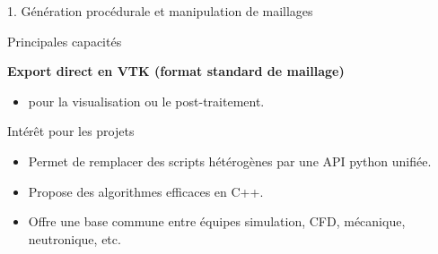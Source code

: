 \begin{frame}{1. Génération procédurale et manipulation de maillages}
\begin{block}{Principales capacités}
\begin{block}{\textbf{Export direct en VTK (format standard de
maillage)}}
\protect\hypertarget{export-direct-en-vtk-format-standard-de-maillage}{}
\begin{itemize}
\tightlist
\item
  pour la visualisation ou le post-traitement.
\end{itemize}
\end{block}
\end{block}

\begin{block}{Intérêt pour les projets}
\protect\hypertarget{intuxe9ruxeat-pour-les-projets}{}
\begin{itemize}
\tightlist
\item
  Permet de remplacer des scripts hétérogènes par une API python
  unifiée.
\item
  Propose des algorithmes efficaces en C++.
\item
  Offre une base commune entre équipes simulation, CFD, mécanique,
  neutronique, etc.
\end{itemize}
\end{block}
\end{frame}

